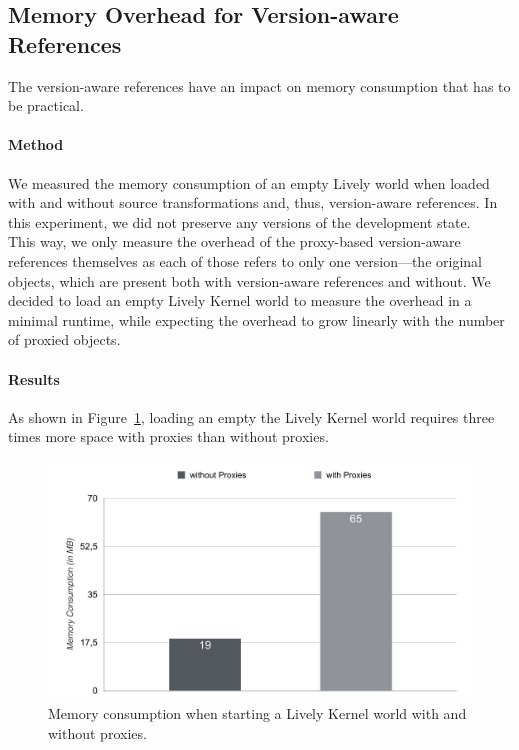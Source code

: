 \subsection{Memory Overhead for Version-aware References}

The version-aware references have an impact on memory consumption that has to be practical.

\paragraph{Method}
We measured the memory consumption of an empty Lively world when loaded with and without source transformations and, thus, version-aware references.
In this experiment, we did not preserve any versions of the development state.\\
This way, we only measure the overhead of the proxy-based version-aware references themselves as each of those refers to only one version---the original objects, which are present both with version-aware references and without.
We decided to load an empty Lively Kernel world to measure the overhead in a minimal runtime, while expecting the overhead to grow linearly with the number of proxied objects.


\paragraph{Results}
As shown in Figure~\ref{fig:MemoryOverheadForReferences}, loading an empty the Lively Kernel world requires three times more space with proxies than without proxies.

\begin{figure}[h]
    \centering
    \includegraphics[width=\textwidth]{figures/6_evaluation/1_memoryOverhead.pdf}
    \caption{Memory consumption when starting a Lively Kernel world with and without proxies.}
    \label{fig:MemoryOverheadForReferences}
\end{figure}

